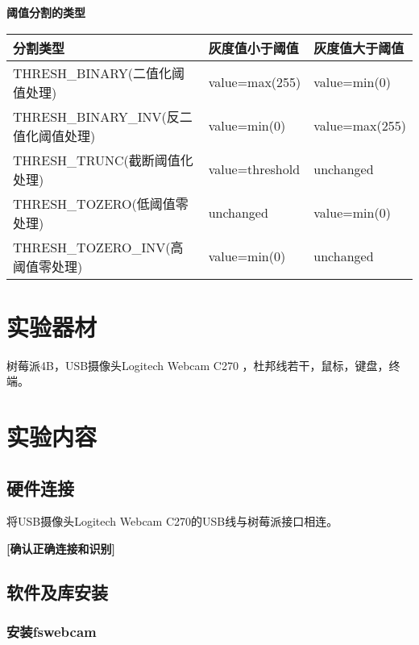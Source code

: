 \documentclass{article}
\begin{document}
\textbf{阈值分割的类型}
\begin{center}
    
\begin{tabular}{|p{7.2cm}|p{2.7cm}|p{2.7cm}|}
   \hline
   分割类型& 灰度值小于阈值  & 灰度值大于阈值  \\\hline
    THRESH\_BINARY(二值化阈值处理) & value=max(255)&  value=min(0)  \\\hline
      THRESH\_BINARY\_INV(反二值化阈值处理)& value=min(0)&value=max(255)    \\\hline
       THRESH\_TRUNC(截断阈值化处理)&value=threshold &   unchanged  \\\hline
        THRESH\_TOZERO(低阈值零处理)&unchanged & value=min(0)    \\\hline
       THRESH\_TOZERO\_INV(高阈值零处理)  &value=min(0) & unchanged   \\\hline
\end{tabular}

\end{center}














\section{实验器材}
树莓派4B，USB摄像头Logitech Webcam C270
，杜邦线若干，鼠标，键盘，终端。

\section{实验内容}
\subsection{硬件连接}
将USB摄像头Logitech Webcam C270的USB线与树莓派接口相连。

\textbf{[确认正确连接和识别]}


\subsection{软件及库安装}

\subsubsection{安装fswebcam}
\end{document}
